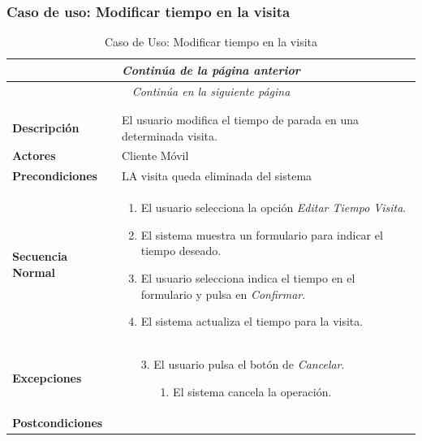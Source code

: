 \newpage
\subsubsection*{Caso de uso: Modificar tiempo en la visita }
\begin{longtable}{| p{4cm} | p{10cm} |}
\endfirsthead
\multicolumn{2}{c}{\textit{Continúa de la página anterior}}\\[12pt]
\hline
\endhead
\hline
\multicolumn{2}{c}{\textit{Continúa en la siguiente página}} \\
\endfoot
\hline
\caption{Caso de Uso: Modificar tiempo en la visita}\label{fig:1}\\
\endlastfoot


\hline
\multicolumn{2}{|c|}{\textbf{CU$<$17$>$ - Modificar Tiempo en la Visita}} \\

\hline
\textbf{Descripción} &
El usuario modifica el tiempo de parada en una determinada visita.\\

\hline
\textbf{Actores} &
Cliente Móvil\\

\hline
\textbf{Precondiciones} &
LA visita queda eliminada del sistema\\

\hline
\textbf{Secuencia Normal} &\mbox{}\par\vspace{-\baselineskip}
\begin{enumerate}[leftmargin=0.7cm, topsep=0.1cm]
\item El usuario selecciona la opción \textit{Editar Tiempo Visita}.
\item El sistema muestra un formulario para indicar el tiempo deseado.
\item El usuario selecciona indica el tiempo en el formulario y pulsa en \textit{Confirmar}.
\item El sistema actualiza el tiempo para la visita.

\end{enumerate}


\\
\hline
\textbf{Excepciones} &\mbox{}\par\vspace{-\baselineskip}
\begin{enumerate}[leftmargin=0.9cm, topsep=0.1cm]
\item[3.] El usuario pulsa el botón de \textit{Cancelar}.
	\begin{itemize}
	\item[1.] El sistema cancela la operación.
	\end{itemize}
\end{enumerate}
\\

\hline
\textbf{Postcondiciones} & \\
\hline
\end{longtable}



